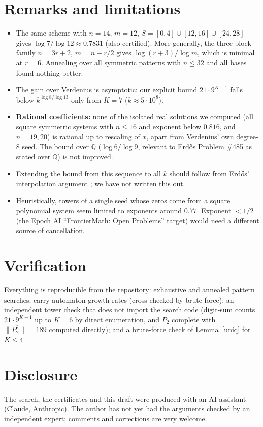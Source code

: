 \documentclass[11pt]{article}
\theoremstyle{remark}\newtheorem*{remark}{Remark}
\begin{document}
\section{Remarks and limitations}
\begin{itemize}
\item The same scheme with $n=14$, $m=12$, $S=[0,4]\cup[12,16]\cup[24,28]$ gives $\log7/\log12\approx0.7831$ (also certified). More generally, the three-block family $n=3r+2$, $m=n-r/2$ gives $\log(r+3)/\log m$, which is minimal at $r=6$. Annealing over all symmetric patterns with $n\le32$ and all bases found nothing better.
\item The gain over Verdenius is asymptotic: our explicit bound $21\cdot 9^{K-1}$ falls below $k^{\log 8/\log 13}$ only from $K=7$ ($k\approx5\cdot10^8$).
\item \textbf{Rational coefficients:} none of the isolated real solutions we computed (all square symmetric systems with $n\le16$ and exponent below $0.816$, and $n=19,20$) is rational up to rescaling of $x$, apart from Verdenius' own degree-8 seed. The bound over $\mathbb Q$ ($\log6/\log9$, relevant to Erd\H{o}s Problem \#485 as stated over $\mathbb Q$) is not improved.
\item Extending the bound from this sequence to all $k$ should follow from Erd\H{o}s' interpolation argument \cite{E}; we have not written this out.
\item Heuristically, towers of a single seed whose zeros come from a square polynomial system seem limited to exponents around $0.77$. Exponent $<1/2$ (the Epoch AI ``FrontierMath: Open Problems'' target) would need a different source of cancellation.
\end{itemize}

\section{Verification}
Everything is reproducible from the repository: exhaustive and annealed pattern searches; carry-automaton growth rates (cross-checked by brute force); an independent tower check that does not import the search code (digit-sum counts $21\cdot9^{K-1}$ up to $K=6$ by direct enumeration, and $P_2$ complete with $\|P_2^2\|=189$ computed directly); and a brute-force check of Lemma~\ref{uniq} for $K\le4$.

\section{Disclosure}
The search, the certificates and this draft were produced with an AI assistant (Claude, Anthropic). The author has not yet had the arguments checked by an independent expert; comments and corrections are very welcome.
\end{document}
